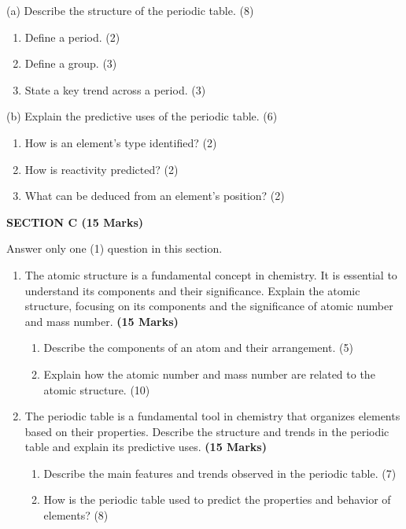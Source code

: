 \documentclass[12pt]{article}
\newcommand{\centerheading}[1]{
    \vspace{0.6em}
    \begin{center}
        {\fontsize{13}{15}\selectfont\bfseries #1}
    \end{center}
    \vspace{0.15em}
}
\newenvironment{questionblock}[1][10]{
    \par\Needspace{#1\baselineskip}
}{
    \par
}
\begin{document}
\begin{enumerate}[start=3]
\begin{questionblock}[15]
    (a) Describe the structure of the periodic table. (8)
    \begin{enumerate}[label=(\roman*)]
      \item Define a period. (2)
      \item Define a group. (3)
      \item State a key trend across a period. (3)
    \end{enumerate}

    (b) Explain the predictive uses of the periodic table. (6)
    \begin{enumerate}[label=(\roman*)]
      \item How is an element's type identified? (2)
      \item How is reactivity predicted? (2)
      \item What can be deduced from an element's position? (2)
    \end{enumerate}
  \end{questionblock}

\end{enumerate}

\centerheading{SECTION C (15 Marks)}
\vspace{-2.0em}
\begin{center}
  Answer only one (1) question in this section.
\end{center}
\vspace{-1.5em}

\begin{enumerate}[start=13]
  \begin{questionblock}[10]
    \item The atomic structure is a fundamental concept in chemistry. It is essential to understand its components and their significance. Explain the atomic structure, focusing on its components and the significance of atomic number and mass number. \textbf{(15 Marks)}
    \begin{enumerate}
      \item Describe the components of an atom and their arrangement. (5)
      \item Explain how the atomic number and mass number are related to the atomic structure. (10)
    \end{enumerate}
  \end{questionblock}

  \begin{questionblock}[10]
    \item The periodic table is a fundamental tool in chemistry that organizes elements based on their properties. Describe the structure and trends in the periodic table and explain its predictive uses. \textbf{(15 Marks)}
    \begin{enumerate}
      \item Describe the main features and trends observed in the periodic table. (7)
      \item How is the periodic table used to predict the properties and behavior of elements? (8)
    \end{enumerate}
  \end{questionblock}

\end{enumerate}
\end{document}
